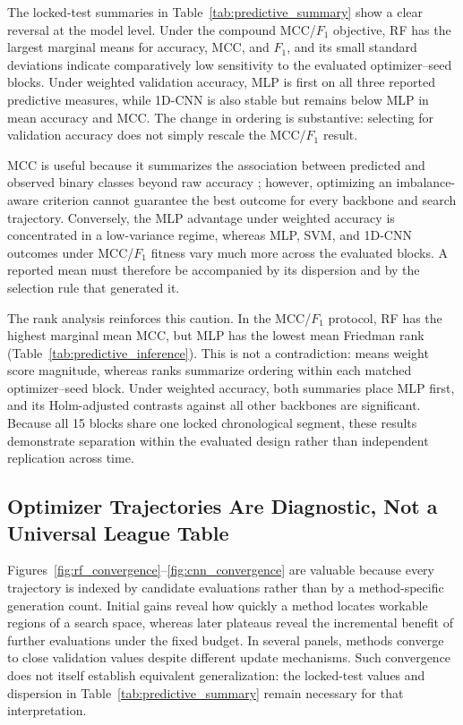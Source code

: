 The locked-test summaries in Table~\ref{tab:predictive_summary} show a clear reversal at the model level. Under the compound MCC/$F_1$ objective, RF has the largest marginal means for accuracy, MCC, and $F_1$, and its small standard deviations indicate comparatively low sensitivity to the evaluated optimizer--seed blocks. Under weighted validation accuracy, MLP is first on all three reported predictive measures, while 1D-CNN is also stable but remains below MLP in mean accuracy and MCC. The change in ordering is substantive: selecting for validation accuracy does not simply rescale the MCC/$F_1$ result.

MCC is useful because it summarizes the association between predicted and observed binary classes beyond raw accuracy \cite{chicco2020mcc}; however, optimizing an imbalance-aware criterion cannot guarantee the best outcome for every backbone and search trajectory. Conversely, the MLP advantage under weighted accuracy is concentrated in a low-variance regime, whereas MLP, SVM, and 1D-CNN outcomes under MCC/$F_1$ fitness vary much more across the evaluated blocks. A reported mean must therefore be accompanied by its dispersion and by the selection rule that generated it.

The rank analysis reinforces this caution. In the MCC/$F_1$ protocol, RF has the highest marginal mean MCC, but MLP has the lowest mean Friedman rank (Table~\ref{tab:predictive_inference}). This is not a contradiction: means weight score magnitude, whereas ranks summarize ordering within each matched optimizer--seed block. Under weighted accuracy, both summaries place MLP first, and its Holm-adjusted contrasts against all other backbones are significant. Because all 15 blocks share one locked chronological segment, these results demonstrate separation within the evaluated design rather than independent replication across time.

\subsection{Optimizer Trajectories Are Diagnostic, Not a Universal League Table}

Figures~\ref{fig:rf_convergence}--\ref{fig:cnn_convergence} are valuable because every trajectory is indexed by candidate evaluations rather than by a method-specific generation count. Initial gains reveal how quickly a method locates workable regions of a search space, whereas later plateaus reveal the incremental benefit of further evaluations under the fixed budget. In several panels, methods converge to close validation values despite different update mechanisms. Such convergence does not itself establish equivalent generalization: the locked-test values and dispersion in Table~\ref{tab:predictive_summary} remain necessary for that interpretation.

